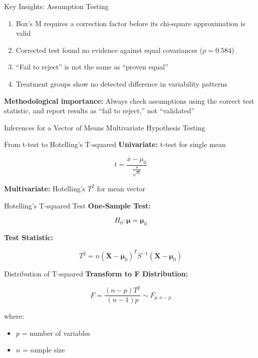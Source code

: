 \documentclass[aspectratio=169,ignorenonframetext]{beamer}
\begin{document}
\begin{frame}{Key Insights: Assumption Testing}
\begin{enumerate}
\item
  Box's M requires a correction factor before its chi-square
  approximation is valid
\item
  Corrected test found no evidence against equal covariances
  (\(p = 0.584\))
\item
  ``Fail to reject'' is not the same as ``proven equal''
\item
  Treatment groups show no detected difference in variability patterns
\end{enumerate}

\textbf{Methodological importance:} Always check assumptions using the
correct test statistic, and report results as ``fail to reject,'' not
``validated''
\end{frame}

\begin{frame}{Inferences for a Vector of Means}
Multivariate Hypothesis Testing
\end{frame}

\begin{frame}{From t-test to Hotelling's T-squared}
\textbf{Univariate:} t-test for single mean

\[t = \frac{\overline{x} - \mu_{0}}{\frac{s}{\sqrt{n}}}\]

\textbf{Multivariate:} Hotelling's \(T^{2}\) for mean vector
\end{frame}

\begin{frame}{Hotelling's T-squared Test}
\textbf{One-Sample Test:}

\[H_{0}:\mathbf{\mu} = \mathbf{\mu}_{0}\]

\textbf{Test Statistic:}

\[T^{2} = {n\left( \overline{\mathbf{X}} - \mathbf{\mu}_{0} \right)}^{T}S^{- 1}\left( \overline{\mathbf{X}} - \mathbf{\mu}_{0} \right)\]
\end{frame}

\begin{frame}{Distribution of T-squared}
\textbf{Transform to F Distribution:}

\[F = \frac{(n - p)T^{2}}{(n - 1)p} \sim F_{p,n - p}\]

where:

\begin{itemize}
\item
  \(p\) = number of variables
\item
  \(n\) = sample size
\end{itemize}
\end{frame}
\end{document}
